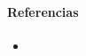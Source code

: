 \documentclass{article}
\begin{document}
\paragraph{Referencias} 

\begin{itemize}

\item 

\end{itemize}
\end{document}
